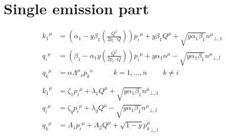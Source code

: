 \section{Single emission part}
\begin{equation}
	\begin{aligned}
	{k_1}^{\mu} &= (\alpha_1 -y\beta_1(\frac{Q^2}{2p_i \cdot Q})) {p_i}^{\mu} + y\beta_1{Q}^{\mu} + \sqrt{y\alpha_1\beta_1}{n^{\mu}}_{\bot,1}  \\
	{q_i}^{\mu}   &= (\beta_1 -\alpha_1 y(\frac{Q^2}{2p_i \cdot Q})){p_i}^{\mu} + y\alpha_1{n}^{\mu} - \sqrt{y\alpha_1\beta_1}{n^{\mu}}_{\bot,l} \\
	{q_k}^{\mu} &= \alpha {\Lambda^{\mu}}_{\nu}{p_k}^{\nu} \:\:\:\:\:\:\:\:\:\:\:\:\: {k=1,...,n}\:\:\:\:\:\:\:\:\:\:k\neq i\\
	\\
	\\
		{k_1}^{\mu} &= \zeta_1 {p_i}^{\mu} + \lambda_1{Q}^{\mu} + \sqrt{y\alpha_1\beta_1}{n^{\mu}}_{\bot,1}  \\
	{q_i}^{\mu}   &= \zeta_q{p_i}^{\mu} + \lambda_q{Q}^{\mu} - \sqrt{y\alpha_1\beta_1}{n^{\mu}}_{\bot,l} \\
	{q_k}^{\mu} &= A_1{p_i}^{\mu} + A_2{Q}^{\mu} + \sqrt{1-y}{p_k^{\mu}}_{\bot,l}\\
    \end{aligned}
\end{equation}

